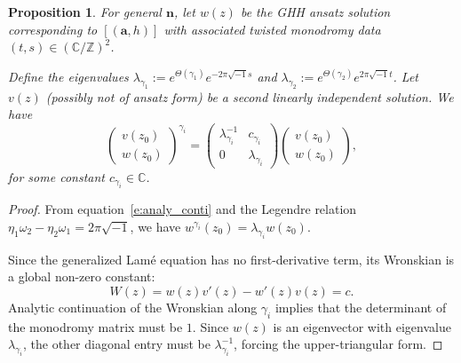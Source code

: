 \documentclass[11pt]{amsart}
\newtheorem{proposition}[theorem]{Proposition}
\theoremstyle{remark}
\numberwithin{equation}{section}
\begin{document}
\begin{proposition} 
For general $\mathbf{n}$, let $w(z)$ be the GHH ansatz solution corresponding to $[(\mathbf{a},h)]$ with associated twisted monodromy data $(t,s) \in (\mathbb{C}/\mathbb{Z})^2$.

Define the eigenvalues $\lambda_{\gamma_1} := e^{\Theta(\gamma_1)} e^{-2\pi \sqrt{-1}s}$ and $\lambda_{\gamma_2} := e^{\Theta(\gamma_2)} e^{2\pi \sqrt{-1}t}$. Let $v(z)$ (possibly not of ansatz form) be a second linearly independent solution. We have
\[
\begin{pmatrix}
    v(z_0) \\
    w(z_0)
\end{pmatrix}^{\gamma_i} = 
\begin{pmatrix}
    \lambda_{\gamma_i}^{-1} & c_{\gamma_i} \\
    0 & \lambda_{\gamma_i} 
\end{pmatrix}
\begin{pmatrix}
    v(z_0) \\
    w(z_0)
\end{pmatrix},
\]
for some constant $c_{\gamma_i} \in \mathbb{C}$. 
\end{proposition}

\begin{proof}
From equation~\eqref{e:analy_conti} and the Legendre relation $\eta_1 \omega_2 - \eta_2 \omega_1 = 2\pi \sqrt{-1}$, we have $w^{\gamma_i}(z_0) = \lambda_{\gamma_i} w(z_0)$.

Since the generalized Lam\'e equation has no first-derivative term, its Wronskian is a global non-zero constant: 
\[
    W(z) = w(z) v'(z) - w'(z) v(z) = c.
\]
Analytic continuation of the Wronskian along $\gamma_i$ implies that the determinant of the monodromy matrix must be $1$. Since $w(z)$ is an eigenvector with eigenvalue $\lambda_{\gamma_i}$, the other diagonal entry must be $\lambda_{\gamma_i}^{-1}$, forcing the upper-triangular form.
\end{proof}
\end{document}
